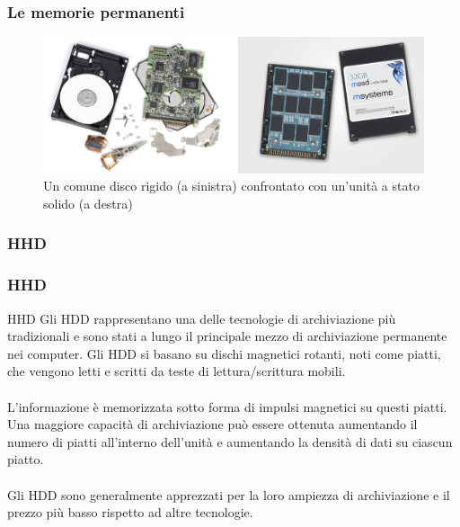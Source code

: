 \begin{frame}
	\frametitle{Le memorie permanenti}
	
	\begin{figure}[!htbp]
		\centering 
		\includegraphics[width=1.0\linewidth]{images/5_memory/hdd_ssd.jpeg}
		\caption{Un comune disco rigido (a sinistra) confrontato con un'unità a stato solido (a destra)}
		\label{fig:memory_hdd_sdd}
	\end{figure}
\end{frame}


\subsubsection[HHD]{HHD}
\begin{frame}
	\frametitle{HHD}
	  
	\begin{block}{HHD}
		Gli HDD rappresentano una delle tecnologie di archiviazione più tradizionali e sono stati a lungo il principale mezzo di archiviazione permanente nei computer. Gli HDD si basano su dischi magnetici rotanti, noti come piatti, che vengono letti e scritti da teste di lettura/scrittura mobili.\\~\\ L'informazione è memorizzata sotto forma di impulsi magnetici su questi piatti. Una maggiore capacità di archiviazione può essere ottenuta aumentando il numero di piatti all'interno dell'unità e aumentando la densità di dati su ciascun piatto.\\~\\
		Gli HDD sono generalmente apprezzati per la loro ampiezza di archiviazione e il prezzo più basso rispetto ad altre tecnologie.
	\end{block}
\end{frame}


